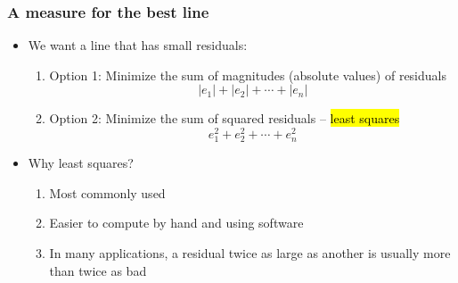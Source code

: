 \begin{frame}
\frametitle{A measure for the best line}

\begin{itemize}

\item We want a line that has small residuals:
\pause
\begin{enumerate}
\item Option 1: Minimize the sum of magnitudes (absolute values) of residuals
\[ |e_1| + |e_2| + \cdots + |e_n| \]
\pause
\item Option 2: Minimize the sum of squared residuals -- \hl{least squares}
\[ e_1^2 + e_2^2 + \cdots + e_n^2 \]
\end{enumerate}

\pause

\item Why least squares?
\pause
\begin{enumerate}
\item Most commonly used
\pause
\item Easier to compute by hand and using software
\pause
\item In many applications, a residual twice as large as another is usually more than twice as bad
\end{enumerate}

\end{itemize}

\end{frame}


